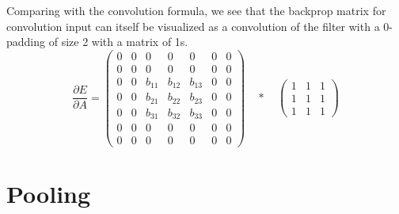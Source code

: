 \documentclass{article}
\begin{document}
\begin{enumerate}
    Comparing with the convolution formula, we see that the backprop matrix for convolution input can itself be visualized as a convolution of the filter with a 0-padding of size 2 with a matrix of 1s. \\
    
    $$\frac{\partial E}{\partial A} = \left(\begin{array}{ccccccc}0 & 0 & 0 & 0 & 0 & 0 & 0 \\ 0 & 0 & 0 & 0 & 0 & 0 & 0 \\ 0 & 0 & b_{11} & b_{12} & b_{13} & 0 & 0 \\ 0 & 0 & b_{21} & b_{22} & b_{23} & 0 & 0 \\ 0 & 0 & b_{31} & b_{32} & b_{33} & 0 & 0 \\ 0 & 0 & 0 & 0 & 0 & 0 & 0 \\ 0 & 0 & 0 & 0 & 0 & 0 & 0\end{array}\right) \quad * \quad\left(\begin{array}{ccc}1 & 1 & 1 \\ 1 & 1 & 1 \\ 1 & 1 & 1\end{array}\right)$$
\end{enumerate}


\section{Pooling}
\end{document}
